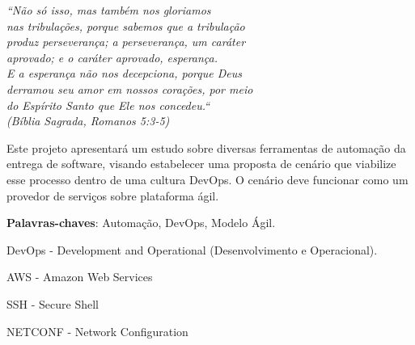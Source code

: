\begin{epigrafe}
    \vspace*{\fill}
	\begin{flushright}
		\textit{``Não só isso, mas também nos gloriamos \\
			nas tribulações, porque sabemos que a tribulação\\
			produz perseverança; a perseverança, um caráter \\
			aprovado; e o caráter aprovado, esperança. \\
			E a esperança não nos decepciona, porque Deus \\
			derramou seu amor em nossos corações, por meio \\
			do Espírito Santo que Ele nos concedeu.``\\
			(Bíblia Sagrada, Romanos 5:3-5)}
			
	\end{flushright}
\end{epigrafe}


\setlength{\absparsep}{18pt} %
\begin{resumo}
Este projeto apresentará um estudo sobre diversas ferramentas de automação da entrega de software, visando estabelecer uma proposta de cenário que viabilize esse processo dentro de uma cultura DevOps. O cenário deve funcionar como um provedor de serviços sobre plataforma ágil.
 

 \textbf{Palavras-chaves}: Automação, DevOps, Modelo Ágil.
 
\end{resumo}




\listoffigures*


\begin{siglas}
  \item DevOps - Development and Operational (Desenvolvimento e Operacional).
  \item AWS - Amazon Web Services
  \item SSH - Secure Shell
  \item NETCONF - Network Configuration
\end{siglas}


\tableofcontents*
\cleardoublepage


